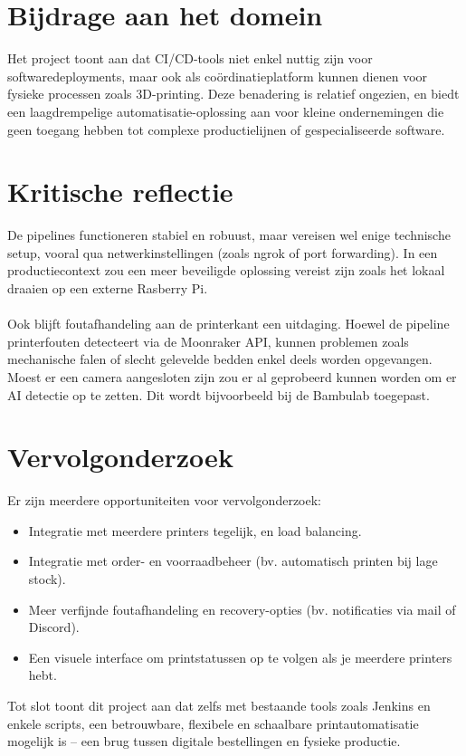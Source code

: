 \section*{Bijdrage aan het domein}

Het project toont aan dat CI/CD-tools niet enkel nuttig zijn voor softwaredeployments, maar ook als coördinatieplatform kunnen dienen voor fysieke processen zoals 3D-printing. Deze benadering is relatief ongezien, en biedt een laagdrempelige automatisatie-oplossing aan voor kleine ondernemingen die geen toegang hebben tot complexe productielijnen of gespecialiseerde software.

\section*{Kritische reflectie}

De pipelines functioneren stabiel en robuust, maar vereisen wel enige technische setup, vooral qua netwerkinstellingen (zoals ngrok of port forwarding). In een productiecontext zou een meer beveiligde oplossing vereist zijn zoals het lokaal draaien op een externe Rasberry Pi.
\\\\
Ook blijft foutafhandeling aan de printerkant een uitdaging. Hoewel de pipeline printerfouten detecteert via de Moonraker API, kunnen problemen zoals mechanische falen of slecht gelevelde bedden enkel deels worden opgevangen. Moest er een camera aangesloten zijn zou er al geprobeerd kunnen worden om er AI detectie op te  zetten. Dit wordt bijvoorbeeld bij de Bambulab toegepast.

\section*{Vervolgonderzoek}

Er zijn meerdere opportuniteiten voor vervolgonderzoek:

\begin{itemize}
    \item Integratie met meerdere printers tegelijk, en load balancing.
    \item Integratie met order- en voorraadbeheer (bv. automatisch printen bij lage stock).
    \item Meer verfijnde foutafhandeling en recovery-opties (bv. notificaties via mail of Discord).
    \item Een visuele interface om printstatussen op te volgen als je meerdere printers hebt.
\end{itemize}

\bigskip

Tot slot toont dit project aan dat zelfs met bestaande tools zoals Jenkins en enkele scripts, een betrouwbare, flexibele en schaalbare printautomatisatie mogelijk is – een brug tussen digitale bestellingen en fysieke productie.


